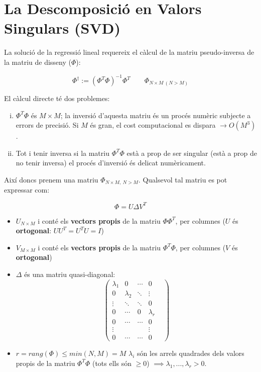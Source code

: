 \section{La Descomposició en Valors Singulars (SVD)}

La solució de la regressió lineal requereix el càlcul de la matriu pseudo-inversa de la matriu de disseny ($\Phi$):

$$ \Phi^{\dag} := ( \Phi^T \Phi)^{-1} \Phi^T \qquad \Phi_{N \times M \ (N > M)} $$

El càlcul directe té dos problemes:
\begin{enumerate}[i)]
	\item $\Phi^T \Phi$ és $M \times M$; la inversió d'aquesta matriu és un procés numèric subjecte a errors de precisió. Si $M$ és gran, el cost computacional es dispara $\rightarrow O(M^3)$.
	\item Tot i tenir inversa si la matriu $\Phi^T \Phi$ està a prop de ser singular (està a prop de no tenir inversa) el procés d'inversió és delicat numèricament.
\end{enumerate}

Així doncs prenem una matriu $\Phi_{N \times M, \ N > M}$. Qualsevol tal matriu es pot expressar com:

$$
\Phi = U \Delta V^T
$$

\begin{itemize}
	\item $U_{N \times M}$ i conté els \textbf{vectors propis} de la matriu $\Phi \Phi^T$, per columnes ($U$ és \textbf{ortogonal}: $U U^T = U^T U = I$)
	\item $V_{M \times M}$ i conté els \textbf{vectors propis} de la matriu $\Phi^T \Phi$, per columnes ($V$ és \textbf{ortogonal})
	\item $\Delta$ és una matriu quasi-diagonal:
	$$
	\begin{pmatrix}
	\lambda_1 & 0 & \cdots &  0 \\
	0 & \lambda_2 & \ddots &  \vdots \\
	\vdots & \ddots & \ddots & 0 & \\
	0 & \cdots & 0 &\lambda_r \\
	0 & \cdots & \cdots & 0 \\
	\vdots & & & \vdots \\
	0 & \cdots & \cdots & 0
	\end{pmatrix}
	$$
	
	\item  $r = rang(\Phi) \le min(N,M) = M$ $\lambda_i$ són les arrels quadrades dels valors propis de la matriu $\Phi^T \Phi$ (tots ells són $\ge 0$) $\implies \lambda_1, ...,\lambda_r > 0$.
\end{itemize}

